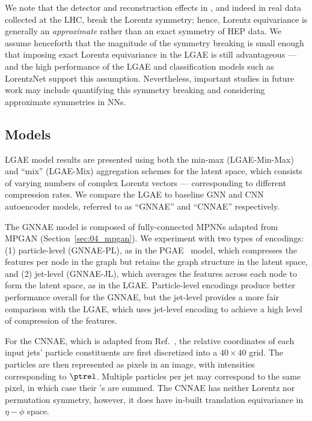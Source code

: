 We note that the detector and reconstruction effects in \jetnet, and indeed in real data collected at the LHC, break the Lorentz symmetry; hence, Lorentz equivariance is generally an \textit{approximate} rather than an exact symmetry of HEP data.
We assume henceforth that the magnitude of the symmetry breaking is small enough that imposing exact Lorentz equivariance in the LGAE is still advantageous --- and the high performance of the LGAE and classification models such as LorentzNet support this assumption.
Nevertheless, important studies in future work may include quantifying this symmetry breaking and considering approximate symmetries in NNs.

\subsection{Models}
\label{sec:06_lgae_models}

LGAE model results are presented using both the min-max (LGAE-Min-Max) and ``mix'' (LGAE-Mix) aggregation schemes for the latent space, which consists of varying numbers of complex Lorentz vectors --- corresponding to different compression rates.
We compare the LGAE to baseline GNN and CNN autoencoder models, referred to as ``GNNAE'' and ``CNNAE'' respectively. 

The GNNAE model is composed of fully-connected MPNNs adapted from MPGAN (Section~\ref{sec:04_mpgan}).
We experiment with two types of encodings: (1) particle-level (GNNAE-PL), as in the PGAE~\cite{Tsan:2021brw} model, which compresses the features per node in the graph but retains the graph structure in the latent space, and (2) jet-level (GNNAE-JL), which averages the features across each node to form the latent space, as in the LGAE.
Particle-level encodings produce better performance overall for the GNNAE, but the jet-level provides a more fair comparison with the LGAE, which uses jet-level encoding to achieve a high level of compression of the features.

For the CNNAE, which is adapted from Ref.~\cite{Farina-anomaly}, the relative coordinates of each input jets' particle constituents are first discretized into a $40 \times 40$ grid.
The particles are then represented as pixels in an image, with intensities corresponding to $\ptrel$.
Multiple particles per jet may correspond to the same pixel, in which case their \ptrel's are summed.
The CNNAE has neither Lorentz nor permutation symmetry, however, it does have in-built translation equivariance in $\eta-\phi$ space.

